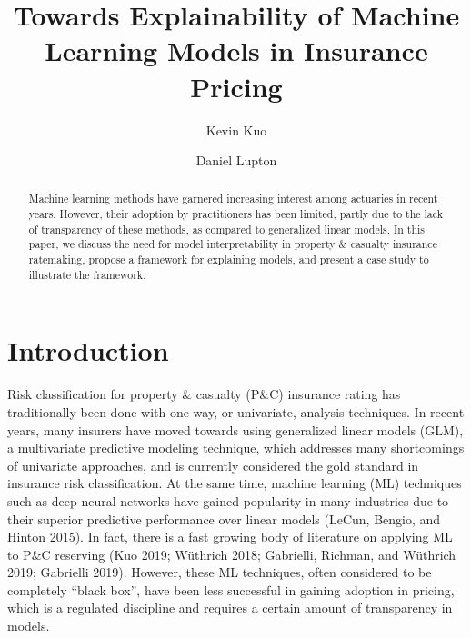 \documentclass[preprint, 3p, twocolumn, letterpaper, 10pt]{elsarticle} %
\begin{document}
\begin{frontmatter}

  \title{Towards Explainability of Machine Learning Models in Insurance Pricing}
    \author[a]{Kevin Kuo}
    \author[b]{Daniel Lupton}
      \address[a]{Kasa AI, 3040 78th Ave SE \#1271, Mercer Island, WA 98040, USA}
    \address[b]{Taylor \& Mulder, 10508 Rivers Bend Lane, Potomac, MD 20854, USA}
    
  \begin{abstract}
  Machine learning methods have garnered increasing interest among actuaries in
  recent years. However, their adoption by practitioners has been limited, partly
  due to the lack of transparency of these methods, as compared to generalized
  linear models. In this paper, we discuss the need for model interpretability in
  property \& casualty insurance ratemaking, propose a framework for explaining
  models, and present a case study to illustrate the framework.
  \end{abstract}
  
 \end{frontmatter}

\hypertarget{introduction}{%
\section{Introduction}\label{introduction}}

Risk classification for property \& casualty (P\&C) insurance rating has traditionally
been done with one-way, or univariate, analysis techniques. In recent years, many
insurers have moved towards using generalized linear models (GLM), a multivariate
predictive modeling technique, which addresses many shortcomings of univariate
approaches, and is currently considered the gold standard in insurance risk
classification. At the same time, machine learning (ML) techniques such as deep
neural networks have gained popularity in many industries due to their superior
predictive performance over linear models (LeCun, Bengio, and Hinton 2015). In fact, there
is a fast growing body of literature on applying ML to P\&C reserving
(Kuo 2019; Wüthrich 2018; Gabrielli, Richman, and Wüthrich 2019; Gabrielli 2019). However, these ML techniques, often considered to be
completely ``black box'', have been less successful in gaining adoption in pricing,
which is a regulated discipline and requires a certain amount of transparency in models.
\end{document}
